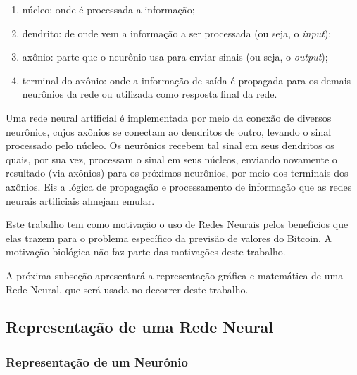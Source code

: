 \begin{enumerate}
    \item núcleo: onde é processada a informação;
    \item dendrito: de onde vem a informação a ser processada (ou seja, o \textit{input});
    \item axônio: parte que o neurônio usa para enviar sinais (ou seja, o \textit{output});
    \item terminal do axônio: onde a informação de saída é propagada para os demais neurônios da rede ou utilizada como resposta final da rede.
\end{enumerate}

Uma rede neural artificial é implementada por meio da conexão de diversos neurônios, cujos axônios se conectam ao dendritos de outro, levando o sinal processado pelo núcleo. Os neurônios recebem tal sinal em seus dendritos os quais, por sua vez, processam o sinal em seus núcleos, enviando novamente o resultado (via axônios) para os próximos neurônios, por meio dos terminais dos axônios. Eis a lógica de propagação e processamento de informação que as redes neurais artificiais almejam emular.

Este trabalho tem como motivação o uso de Redes Neurais pelos benefícios que elas trazem para o problema específico da previsão de valores do Bitcoin. A motivação biológica não faz parte das motivações deste trabalho.

A próxima subseção apresentará a representação gráfica e matemática de uma Rede Neural, que será usada no decorrer deste trabalho.

\subsection{Representação de uma Rede Neural}

\subsubsection{Representação de um Neurônio}
\label{subsubsec:representacaoumneuronio}

